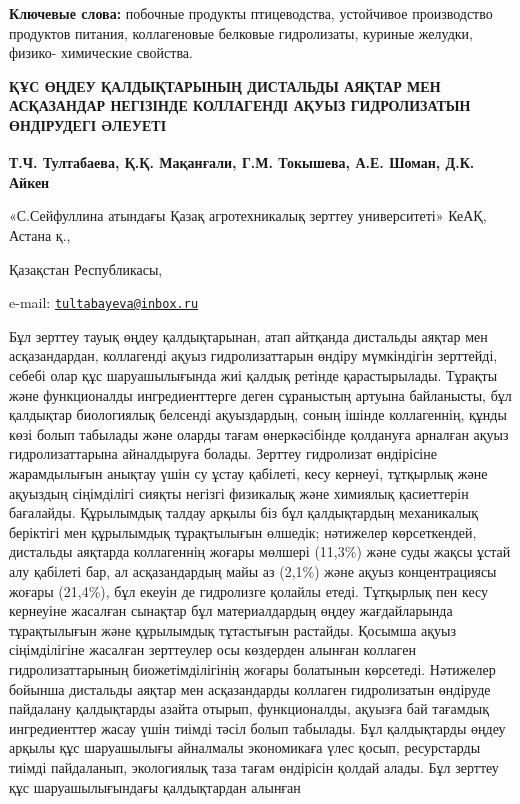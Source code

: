 {\bfseries Ключевые слова:} побочные продукты птицеводства, устойчивое
производство продуктов питания, коллагеновые белковые гидролизаты,
куриные желудки, физико- химические свойства.

\begin{articleheader}
{\bfseries ҚҰС ӨҢДЕУ ҚАЛДЫҚТАРЫНЫҢ ДИСТАЛЬДЫ АЯҚТАР МЕН АСҚАЗАНДАР НЕГІЗІНДЕ
КОЛЛАГЕНДІ АҚУЫЗ ГИДРОЛИЗАТЫН ӨНДІРУДЕГІ ӘЛЕУЕТІ}

{\bfseries Т.Ч. Тултабаева\textsuperscript{\envelope }, Қ.Қ. Мақанғали, Г.М.
Токышева, А.Е. Шоман, Д.К. Айкен}
\end{articleheader}

\begin{affiliation}
«С.Сейфуллина атындағы Қазақ агротехникалық зерттеу университеті» КеАҚ,
Астана қ.,

Қазақстан Республикасы,

e-mail: \href{mailto:tultabayeva@inbox.ru}{\nolinkurl{tultabayeva@inbox.ru}}
\end{affiliation}

Бұл зерттеу тауық өңдеу қалдықтарынан, атап айтқанда дистальды аяқтар
мен асқазандардан, коллагенді ақуыз гидролизаттарын өндіру мүмкіндігін
зерттейді, себебі олар құс шаруашылығында жиі қалдық ретінде
қарастырылады. Тұрақты және функционалды ингредиенттерге деген
сұраныстың артуына байланысты, бұл қалдықтар биологиялық белсенді
ақуыздардың, соның ішінде коллагеннің, құнды көзі болып табылады және
оларды тағам өнеркәсібінде қолдануға арналған ақуыз гидролизаттарына
айналдыруға болады. Зерттеу гидролизат өндірісіне жарамдылығын анықтау
үшін су ұстау қабілеті, кесу кернеуі, тұтқырлық және ақуыздың
сіңімділігі сияқты негізгі физикалық және химиялық қасиеттерін
бағалайды. Құрылымдық талдау арқылы біз бұл қалдықтардың механикалық
беріктігі мен құрылымдық тұрақтылығын өлшедік; нәтижелер көрсеткендей,
дистальды аяқтарда коллагеннің жоғары мөлшері (11,3\%) және суды жақсы
ұстай алу қабілеті бар, ал асқазандардың майы аз (2,1\%) және ақуыз
концентрациясы жоғары (21,4\%), бұл екеуін де гидролизге қолайлы етеді.
Тұтқырлық пен кесу кернеуіне жасалған сынақтар бұл материалдардың өңдеу
жағдайларында тұрақтылығын және құрылымдық тұтастығын растайды. Қосымша
ақуыз сіңімділігіне жасалған зерттеулер осы көздерден алынған коллаген
гидролизаттарының биожетімділігінің жоғары болатынын көрсетеді.
Нәтижелер бойынша дистальды аяқтар мен асқазандарды коллаген
гидролизатын өндіруде пайдалану қалдықтарды азайта отырып, функционалды,
ақуызға бай тағамдық ингредиенттер жасау үшін тиімді тәсіл болып
табылады. Бұл қалдықтарды өңдеу арқылы құс шаруашылығы айналмалы
экономикаға үлес қосып, ресурстарды тиімді пайдаланып, экологиялық таза
тағам өндірісін қолдай алады. Бұл зерттеу құс шаруашылығындағы
қалдықтардан алынған

